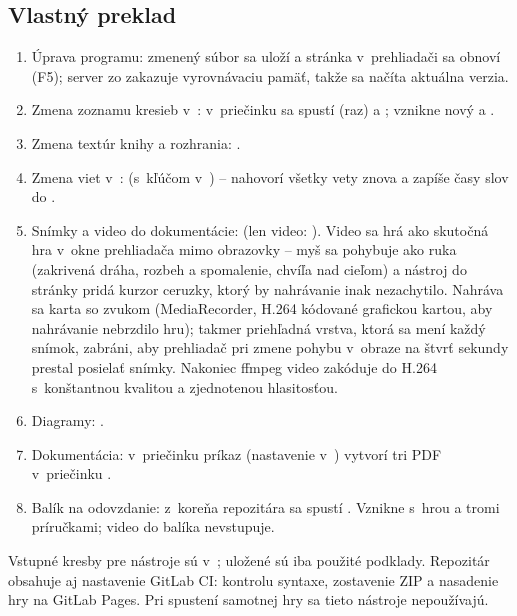 \documentclass[11pt, a4paper]{article}
\begin{document}
\subsection{Vlastný preklad}

\begin{enumerate}
  \item Úprava programu: zmenený súbor sa uloží a stránka v~prehliadači sa obnoví (F5);
    server zo  zakazuje vyrovnávaciu pamäť, takže sa načíta aktuálna verzia.
  \item Zmena zoznamu kresieb v~: v~priečinku  sa spustí
     (raz) a ; vznikne nový  a .
  \item Zmena textúr knihy a rozhrania: .
  \item Zmena viet v~:  (s~kľúčom v~) – nahovorí
    všetky vety znova a zapíše časy slov do .
  \item Snímky a video do dokumentácie:  (len video: ).
    Video sa hrá ako skutočná hra v~okne prehliadača mimo obrazovky – myš sa pohybuje ako ruka
    (zakrivená dráha, rozbeh a spomalenie, chvíľa nad cieľom) a nástroj do stránky pridá kurzor
    ceruzky, ktorý by nahrávanie inak nezachytilo. Nahráva sa karta so zvukom (MediaRecorder,
    H.264 kódované grafickou kartou, aby nahrávanie nebrzdilo hru); takmer priehľadná vrstva,
    ktorá sa mení každý snímok, zabráni, aby prehliadač pri zmene pohybu v~obraze na štvrť
    sekundy prestal posielať snímky. Nakoniec ffmpeg video zakóduje do H.264 s~konštantnou
    kvalitou a zjednotenou hlasitosťou.
  \item Diagramy: .
  \item Dokumentácia: v~priečinku  príkaz  (nastavenie
    v~) vytvorí tri PDF v~priečinku .
  \item Balík na odovzdanie: z~koreňa repozitára sa spustí .
    Vznikne  s~hrou a tromi príručkami; video do balíka nevstupuje.
\end{enumerate}

Vstupné kresby pre nástroje sú v~; uložené sú iba použité podklady.
Repozitár obsahuje aj nastavenie GitLab CI: kontrolu syntaxe, zostavenie ZIP a nasadenie hry
na GitLab Pages. Pri spustení samotnej hry sa tieto nástroje nepoužívajú.
\end{document}
